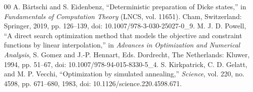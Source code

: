\documentclass[conference]{IEEEtran}
\begin{document}
\begin{thebibliography}{00}
 A. B\"{a}rtschi and S. Eidenbenz, ``Deterministic preparation of Dicke states,'' in \textit{Fundamentals of Computation Theory} (LNCS, vol. 11651). Cham, Switzerland: Springer, 2019, pp. 126--139, doi: 10.1007/978-3-030-25027-0\_9.
 M. J. D. Powell, ``A direct search optimization method that models the objective and constraint functions by linear interpolation,'' in \textit{Advances in Optimization and Numerical Analysis}, S. Gomez and J.-P. Hennart, Eds. Dordrecht, The Netherlands: Kluwer, 1994, pp. 51--67, doi: 10.1007/978-94-015-8330-5\_4.
 S. Kirkpatrick, C. D. Gelatt, and M. P. Vecchi, ``Optimization by simulated annealing,'' \textit{Science}, vol. 220, no. 4598, pp. 671--680, 1983, doi: 10.1126/science.220.4598.671.
\end{thebibliography}
\end{document}
